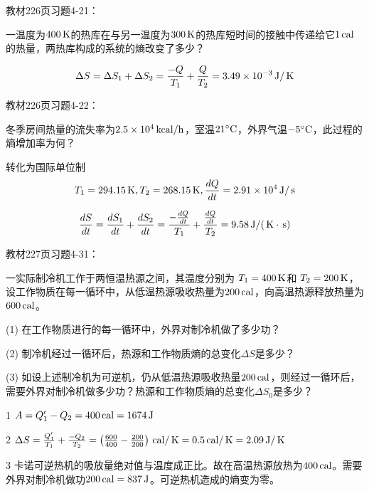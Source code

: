 \documentclass[CJK]{beamer}
\begin{document}
\begin{frame}
  \chtitle{\proid (\sone)}
  \bch
  教材226页习题4-21：

  一温度为$400\,\mathrm{K}$的热库在与另一温度为$300\,\mathrm{K}$的热库短时间的接触中传递给它$1\,\mathrm{cal}$的热量，两热库构成的系统的熵改变了多少？
  \ech
\end{frame}


\begin{frame}
  \bch
  $$\Delta S =\Delta S_1 + \Delta S_2 =  \frac{-Q}{T_1} +\frac{Q}{T_2} = 3.49\times 10^{-3} \,\mathrm{J}/\,\mathrm{K}$$
  \ech
\end{frame}



\begin{frame}
  \chtitle{\proid (\sone)}
  \bch
  教材226页习题4-22：

  冬季房间热量的流失率为$2.5\times 10^4\,\mathrm{kcal}/\mathrm{h}$，室温$21^\circ \mathrm{C}$，外界气温$-5^\circ \mathrm{C}$，此过程的熵增加率为何？
  \ech
\end{frame}


\begin{frame}
  \bch
  转化为国际单位制
  $$T_1 = 294.15\,\mathrm{K}, T_2 = 268.15\,\mathrm{K}, \frac{dQ}{dt} = 2.91\times 10^4 \,\mathrm{J}/\,\mathrm{s}$$
  
  $$\frac{d S}{dt} = \frac{d S_1}{dt} + \frac{d S_2}{dt} = \frac{-\frac{dQ}{dt}}{T_1} +\frac{\frac{dQ}{dt}}{T_2} = 9.58 \,\mathrm{J}/(\,\mathrm{K}\cdot\,\mathrm{s})$$
  \ech
\end{frame}




\begin{frame}
  \chtitle{\proid (\stwo)}
  \bch
  教材227页习题4-31：

  一实际制冷机工作于两恒温热源之间，其温度分别为 $T_1= 400\,\mathrm{K}$和 $T_2 = 200\,\mathrm{K}$，设工作物质在每一循环中，从低温热源吸收热量为$200\,\mathrm{cal}$，向高温热源释放热量为$600\,\mathrm{cal}$。
  \bitem
\item[(1)]{在工作物质进行的每一循环中，外界对制冷机做了多少功？}
\item[(2)]{制冷机经过一循环后，热源和工作物质熵的总变化$\Delta S$是多少？}
\item[(3)]{如设上述制冷机为可逆机，仍从低温热源吸收热量$200\,\mathrm{cal}$，则经过一循环后，需要外界对制冷机做多少功？热源和工作物质熵的总变化$\Delta S_0$是多少？}
  \eitem
  
  \ech
\end{frame}


\begin{frame}
  \bch
  {\small
    \bitem
  \item[1]{$A = Q_1'-Q_2  = 400\,\mathrm{cal} = 1674\,\mathrm{J}$}
  \item[2]{$\Delta S = \frac{Q_1'}{T_1}+\frac{-Q_2}{T_2} = \left(\frac{600}{400}-\frac{200}{200}\right)\,\mathrm{cal}/\,\mathrm{K} = 0.5\,\mathrm{cal}/\,\mathrm{K} = 2.09\,\mathrm{J}/\,\mathrm{K}$}
  \item[3]{卡诺可逆热机的吸放量绝对值与温度成正比。故在高温热源放热为$400\,\mathrm{cal}$。需要外界对制冷机做功$200\,\mathrm{cal} = 837\,\mathrm{J}$。可逆热机造成的熵变为零。}
  \eitem
  }
  \ech
\end{frame}
\end{document}
